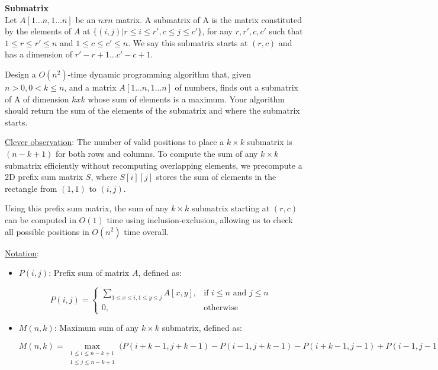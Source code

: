 \textbf{Submatrix} \\
Let $A[1 \ldots n, 1 \ldots n]$ be an $n x n$ matrix. A submatrix of A is the matrix constituted by the elements
of $A$ at $\{(i, j) |r \leq i \leq r', c \leq j \leq c'\}$, for any $r, r', c, c'$ such that $1 \leq r \leq r' \leq n$
and $1 \leq c \leq c' \leq n$. We say this submatrix starts at $(r, c)$ and has a dimension of $r'-r + 1 \ldots c'
-c + 1$. 

Design a $O(n^2)$-time dynamic programming algorithm that, given $n > 0, 0 < k \leq n$, and a matrix
$A[1 \ldots n, 1 \ldots n]$ of numbers, finds out a submatrix of A of dimension $k x k$ whose sum of elements is
a maximum. Your algorithm should return the sum of the elements of the submatrix and where the
submatrix starts.

\begin{customsolutionbox}
    \underline{Clever observation}: 
        The number of valid positions to place a $k \times k$ submatrix is $(n - k + 1)$ for both rows and columns. 
        To compute the sum of any $k \times k$ submatrix efficiently without recomputing overlapping elements,
        we precompute a 2D prefix sum matrix $S$, where $S[i][j]$ stores the sum of elements in the rectangle from $(1, 1)$ to $(i, j)$. 

        Using this prefix sum matrix, the sum of any $k \times k$ submatrix starting at $(r, c)$ can be computed in $O(1)$ time 
        using inclusion-exclusion, allowing us to check all possible positions in $O(n^2)$ time overall.

    \underline{Notation}:

        \begin{itemize}
            \item $P(i, j)$: Prefix sum of matrix $A$, defined as:
        
            \[
            P(i, j) =
            \begin{cases}
            \sum_{1 \leq x \leq i, 1 \leq y \leq j} A[x, y], & \text{if } i \leq n \text{ and } j \leq n \\[8pt]
            0, & \text{otherwise}
            \end{cases}
            \]
        
            \item $M(n, k)$: Maximum sum of any $k \times k$ submatrix, defined as:
        
            \[
            M(n, k) = 
            \max_{\substack{1 \leq i \leq n-k+1 \\ 1 \leq j \leq n-k+1}} 
            \Big( 
            P(i+k-1, j+k-1) 
            - P(i-1, j+k-1) 
            - P(i+k-1, j-1) 
            + P(i-1, j-1) 
            \Big)
            \]


\end{itemize}
\end{customsolutionbox}
